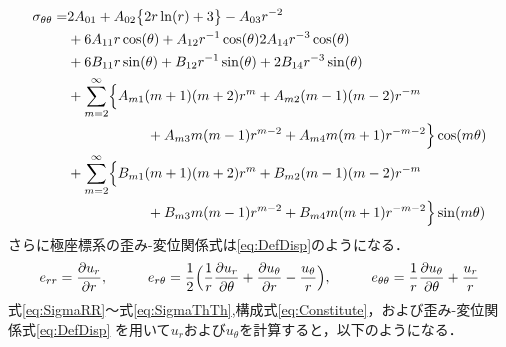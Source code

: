 \begin{align}
	\sigma_{\theta\theta} =&2A_{01}
	+A_{02}\bigl\{ 2r\ln(r)+3\bigr\}
	-A_{03}r^{-2}
	\nonumber
	\\
	&+6A_{11}r\cos(\theta)
	+A_{12}r^{-1}\cos(\theta)
	2A_{14}r^{-3}\cos(\theta)
	\nonumber
	\\
	&+6B_{11}r\sin(\theta)
	+B_{12}r^{-1}\sin(\theta)
	+2B_{14}r^{-3}\sin(\theta)
	\nonumber
	\\
	&+\sum_{m=2}^{\infty}\Bigl\{A_{m1}(m+1)(m+2)r^{m}
	+A_{m2}(m-1)(m-2)r^{-m}
	\nonumber
	\\
	&\hspace{2.0cm}
	+A_{m3}m(m-1)r^{m-2}
	+A_{m4}m(m+1)r^{-m-2}\Bigr\}\cos(m\theta)
	\nonumber
	\\
	&+\sum_{m=2}^{\infty}\Bigl\{B_{m1}(m+1)(m+2)r^{m}
	+B_{m2}(m-1)(m-2)r^{-m}
	\nonumber
	\\
	&\hspace{2.0cm}
	+B_{m3}m(m-1)r^{m-2}
	+B_{m4}m(m+1)r^{-m-2}\Bigr\}\sin(m\theta)
	\label{eq:SigmaThTh}
\end{align}
さらに極座標系の歪み-変位関係式は\eqref{eq:DefDisp}のようになる．
\begin{align}
	e_{rr}=\frac{\partial u_{r}}{\partial r},\hspace{1cm}
	e_{r\theta}=\frac{1}{2}\Bigl( \frac{1}{r}\frac{\partial u_{r}}{\partial \theta}
	+\frac{\partial u_{\theta}}{\partial r}-\frac{u_{\theta}}{r}\Bigr),\hspace{1cm}
	e_{\theta\theta}=\frac{1}{r}\frac{\partial u_{\theta}}{\partial \theta}+\frac{u_{r}}{r}
	\label{eq:DefDisp}
\end{align}
式\eqref{eq:SigmaRR}～式\eqref{eq:SigmaThTh},構成式\eqref{eq:Constitute}，および歪み-変位関係式\eqref{eq:DefDisp}
を用いて$u_r$および$u_\theta$を計算すると，以下のようになる．
